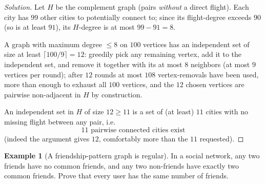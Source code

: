 \documentclass[11pt]{article}
\theoremstyle{definition}
\newtheorem{example}{Example}[section]
\begin{document}
\begin{proof}[Solution]
Let $H$ be the complement graph (pairs \emph{without} a direct flight). Each city has $99$ other cities to potentially connect to; since its flight-degree exceeds $90$ (so is at least $91$), its $H$-degree is at most $99-91=8$.

A graph with maximum degree $\le8$ on $100$ vertices has an independent set of size at least $\lceil100/9\rceil=12$: greedily pick any remaining vertex, add it to the independent set, and remove it together with its at most $8$ neighbors (at most $9$ vertices per round); after $12$ rounds at most $108$ vertex-removals have been used, more than enough to exhaust all $100$ vertices, and the $12$ chosen vertices are pairwise non-adjacent in $H$ by construction.

An independent set in $H$ of size $12\ge11$ is a set of (at least) $11$ cities with no missing flight between any pair, i.e.
\[
\boxed{11 \text{ pairwise connected cities exist}}
\]
(indeed the argument gives $12$, comfortably more than the $11$ requested).
\end{proof}

\begin{example}[A friendship-pattern graph is regular]
In a social network, any two friends have no common friends, and any two non-friends have exactly two common friends. Prove that every user has the same number of friends.
\end{example}
\end{document}
